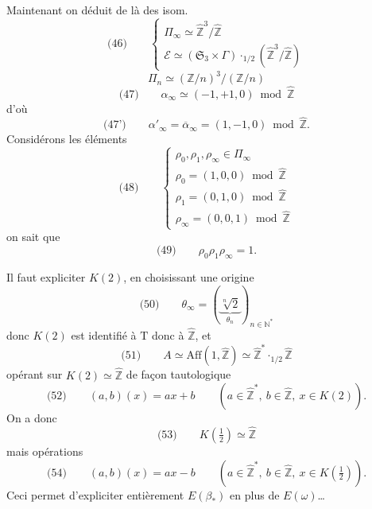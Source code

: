 \documentclass[11pt,a4paper]{article}
\begin{document}
Maintenant on déduit de là des isom.
\[
  \text{(46)} \qquad
  \begin{cases}
    \Pi_\infty \simeq \widehat{\mathbb{Z}}^{3}/\widehat{\mathbb{Z}} \\
    \mathcal{E} \simeq (\mathfrak{S}_3 \times \Gamma) \cdot_{1/2} (\widehat{\mathbb{Z}}^{3}/\widehat{\mathbb{Z}})
  \end{cases}
\]
\[
  \Pi_n \simeq (\mathbb{Z}/n)^{3}/(\mathbb{Z}/n)
\]
\[
  \text{(47)} \qquad \alpha_\infty \simeq (-1, +1, 0) \bmod \widehat{\mathbb{Z}}
\]
d'où
\[
  \text{(47')} \qquad \alpha'_\infty = \overline{\alpha}_\infty = (1, -1, 0) \bmod \widehat{\mathbb{Z}} .
\]
Considérons les éléments
\[
  \text{(48)} \qquad
  \begin{cases}
    \rho_0, \rho_1, \rho_\infty \in \Pi_\infty \\
    \rho_0 = (1, 0, 0) \bmod \widehat{\mathbb{Z}} \\
    \rho_1 = (0, 1, 0) \bmod \widehat{\mathbb{Z}} \\
    \rho_\infty = (0, 0, 1) \bmod \widehat{\mathbb{Z}}
  \end{cases}
\]
on sait que
\[
  \text{(49)} \qquad \rho_0 \rho_1 \rho_\infty = 1 .
\]


Il faut expliciter $K(2)$, \struck{\ill{}} en choisissant une origine
\[
  \text{(50)} \qquad \theta_\infty = (\underbrace{\sqrt[n]{2}}_{\theta_n})_{n \in \mathbb{N}^{*}}
\]
donc $K(2)$ est identifié à $\mathrm{T}$ donc à $\widehat{\mathbb{Z}}$, et
\[
  \text{(51)} \qquad A \simeq \mathrm{Aff}(1, \widehat{\mathbb{Z}}) \simeq \widehat{\mathbb{Z}}^{*} \cdot_{1/2} \widehat{\mathbb{Z}}
\]
opérant sur $K(2) \simeq \widehat{\mathbb{Z}}$ de façon tautologique
\[
  \text{(52)} \qquad (a, b)(x) = ax + b \qquad (a \in \widehat{\mathbb{Z}}^{*},\ b \in \widehat{\mathbb{Z}},\ x \in K(2)) .
\]
On a donc
\[
  \text{(53)} \qquad K(\tfrac12) \simeq \widehat{\mathbb{Z}}
\]
mais opérations
\[
  \text{(54)} \qquad (a, b)(x) = ax - b \qquad (a \in \widehat{\mathbb{Z}}^{*},\ b \in \widehat{\mathbb{Z}},\ x \in K(\tfrac12)) .
\]
Ceci permet d'expliciter entièrement $E(\beta_{*})$ en plus de $E(\omega)$\ldots
{}
\end{document}
